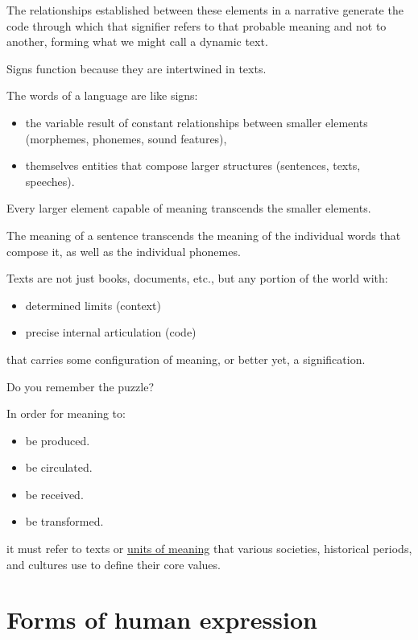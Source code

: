 The relationships established between these elements in a narrative generate the code through which that signifier refers to that probable meaning and not to another, forming what we might call a dynamic text.

Signs function because they are intertwined in texts.

The words of a language are like signs:

\begin{itemize}
\tightlist
\item the variable result of constant relationships between smaller elements (morphemes, phonemes, sound features),
\item themselves entities that compose larger structures (sentences, texts, speeches).
\end{itemize}

Every larger element capable of meaning transcends the smaller elements.

The meaning of a sentence transcends the meaning of the individual words that compose it, as well as the individual phonemes.

Texts are not just books, documents, etc., but any portion of the world with:

\begin{itemize}
\tightlist
\item determined limits (context)
\item precise internal articulation (code)
\end{itemize}

that carries some configuration of meaning, or better yet, a signification.

Do you remember the puzzle?

In order for meaning to:

\begin{itemize}
\tightlist
\item be produced.
\item be circulated.
\item be received.
\item be transformed.
\end{itemize}

it must refer to texts or \href{storia1.mp4}{units of meaning} that various societies, historical periods, and cultures use to define their core values.

\section{Forms of human expression}\label{forms-of-human-expression}

